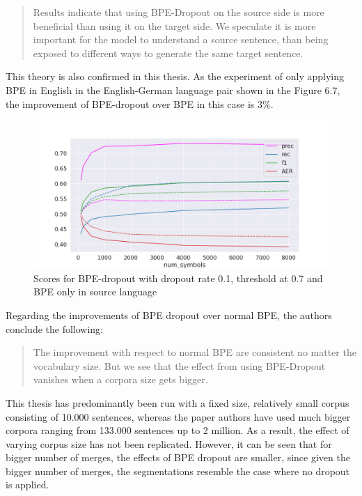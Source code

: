 \begin{quote}
	Results indicate that using BPE-Dropout on the source side is more beneficial than using it on the target side. We speculate it is more important for the model to understand a source sentence, than being exposed to different ways to generate the same target sentence.
\end{quote}

This theory is also confirmed in this thesis. As the experiment of only applying BPE in English in the English-German language pair shown in the Figure 6.7, the improvement of BPE-dropout over BPE in this case is 3\%.

\begin{figure}[!ht]
    \centering
    \includegraphics[width=13cm]{../reports/scores_dropout_bpe/space/0.1/eng_deu_0.7_thres_fastalign_eng.png}
    \caption{Scores for BPE-dropout with dropout rate 0.1, threshold at 0.7 and BPE only in source language}
\end{figure}

Regarding the improvements of BPE dropout over normal BPE, the authors conclude the following:

\begin{quote}
	The improvement with respect to normal BPE are consistent no matter the vocabulary size. But we see that the effect from using BPE-Dropout vanishes when a corpora size gets bigger.
\end{quote}

This thesis has predominantly been run with a fixed size, relatively small corpus consisting of 10.000 sentences, whereas the paper authors have used much bigger corpora ranging from 133.000 sentences up to 2 million. As a result, the effect of varying corpus size has not been replicated. However, it can be seen that for bigger number of merges, the effects of BPE dropout are smaller, since given the bigger number of merges, the segmentations resemble the case where no dropout is applied.


